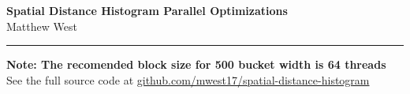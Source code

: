 \documentclass[a4paper,12pt]{article}
\begin{document}
	\pagestyle{fancy}
	\thispagestyle{empty}
	\fancyhead[R]{}
	\fancyhead[L]{}
	\renewcommand*{\thefootnote}{\fnsymbol{footnote}}
	\begin{center}
		\Large{\textbf{Spatial Distance Histogram Parallel Optimizations}}
		\vspace{0.4cm}
		\normalsize
		\\ Matthew West
		\vspace{0.1cm}
		\medskip
		\normalsize
	\end{center}
	{\color{gray}\hrule}
	\vspace{0.4cm}
	\medskip
	\begin{multicols}{2}
	\end{multicols}
	
	\begin{multicols}{2}
	\end{multicols}
	 
 	\vspace{20pt}
 	
 	\noindent \textbf{Note: The recomended block size for 500 bucket width is 64 threads}\\
	\noindent See the full source code at \href{https://github.com/mwest17/spatial-distance-histogram}{github.com/mwest17/spatial-distance-histogram}

\end{document}
